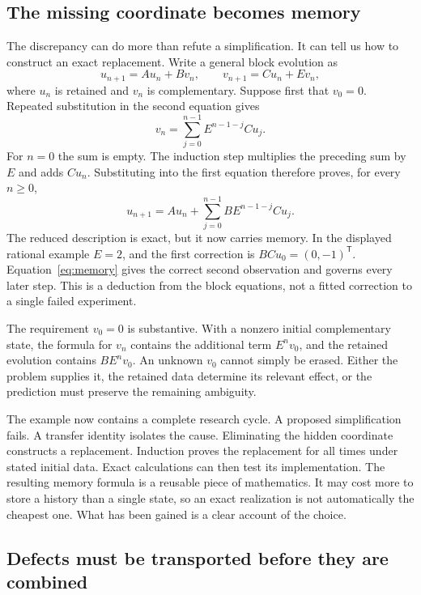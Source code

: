 \clearpage
\subsection{The missing coordinate becomes memory}

The discrepancy can do more than refute a simplification. It can tell us how to construct an exact replacement. Write a general block evolution as
\[
 u_{n+1}=Au_n+Bv_n,\qquad v_{n+1}=Cu_n+Ev_n,
\]
where \(u_n\) is retained and \(v_n\) is complementary. Suppose first that \(v_0=0\). Repeated substitution in the second equation gives
\[
 v_n=\sum_{j=0}^{n-1}E^{n-1-j}Cu_j.
\]
For \(n=0\) the sum is empty. The induction step multiplies the preceding sum by \(E\) and adds \(Cu_n\). Substituting into the first equation therefore proves, for every \(n\geq0\),
\begin{equation}\label{eq:memory}
 u_{n+1}=Au_n+\sum_{j=0}^{n-1}BE^{n-1-j}Cu_j.
\end{equation}
The reduced description is exact, but it now carries memory. In the displayed rational example \(E=2\), and the first correction is \(BCu_0=(0,-1)^{\mathsf T}\). Equation~\eqref{eq:memory} gives the correct second observation and governs every later step. This is a deduction from the block equations, not a fitted correction to a single failed experiment.

The requirement \(v_0=0\) is substantive. With a nonzero initial complementary state, the formula for \(v_n\) contains the additional term \(E^nv_0\), and the retained evolution contains \(BE^nv_0\). An unknown \(v_0\) cannot simply be erased. Either the problem supplies it, the retained data determine its relevant effect, or the prediction must preserve the remaining ambiguity.

The example now contains a complete research cycle. A proposed simplification fails. A transfer identity isolates the cause. Eliminating the hidden coordinate constructs a replacement. Induction proves the replacement for all times under stated initial data. Exact calculations can then test its implementation. The resulting memory formula is a reusable piece of mathematics. It may cost more to store a history than a single state, so an exact realization is not automatically the cheapest one. What has been gained is a clear account of the choice.

\clearpage
\subsection{Defects must be transported before they are combined}

